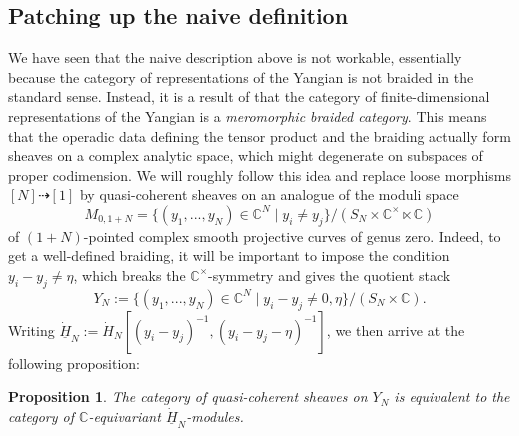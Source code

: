 \documentclass[11pt]{report}
\newtheorem{prop}[theorem]{Proposition}
\theoremstyle{definition}
\theoremstyle{remark}
\theoremstyle{remark}
\newcommand{\C}{\mathbb{C}}
\begin{document}
\subsection{Patching up the naive definition}\label{subsection:patch}

We have seen that the naive description above is not workable, essentially because the category of representations of the Yangian is not braided in the standard sense. Instead, it is a result of \cite{article:soibelman:1997} that the category of finite-dimensional representations of the Yangian is a \emph{meromorphic braided category}. This means that the operadic data defining the tensor product and the braiding actually form sheaves on a complex analytic space, which might degenerate on subspaces of proper codimension. We will roughly follow this idea and replace loose morphisms $[N] \dashrightarrow [1]$ by quasi-coherent sheaves on an analogue of the moduli space
\begin{equation*}
M_{0,1+N} = \{ (y_1,...,y_N) \in \C^N \mid y_i \neq y_j \} / (S_N \times \C^\times \ltimes \C)
\end{equation*}
of $(1+N)$-pointed complex smooth projective curves of genus zero. Indeed, to get a well-defined braiding, it will be important to impose the condition $y_i-y_j \neq \eta$, which breaks the $\C^\times$-symmetry and gives the quotient stack
\begin{equation*}
Y_N := \{ (y_1,...,y_N) \in \C^N \mid y_i-y_j \neq 0,\eta \}/(S_N \times \C).
\end{equation*}
Writing $\underline{\dot H}_N := \dot H_N[(y_i-y_j)^{-1},(y_i-y_j-\eta)^{-1}]$, we then arrive at the following proposition:

\begin{prop}
The category of quasi-coherent sheaves on $Y_N$ is equivalent to the category of $\C$-equivariant $\underline{\dot H}_N$-modules.
\end{prop}
\end{document}
